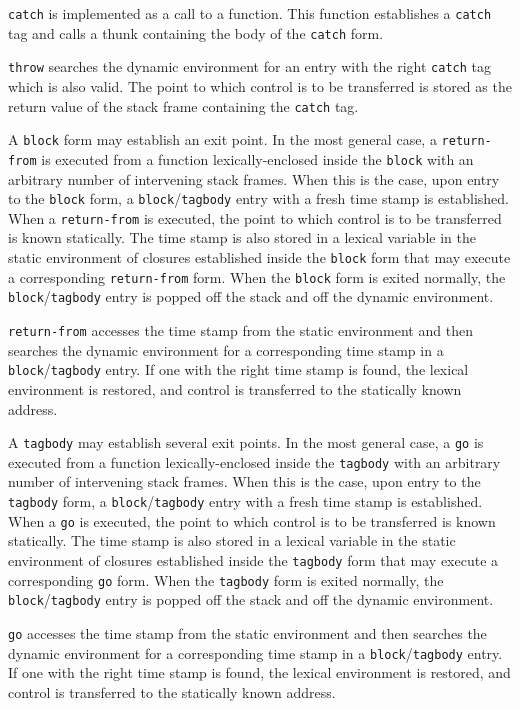 \texttt{catch} is implemented as a call to a function.  This function
establishes a \texttt{catch} tag and calls a thunk containing the body
of the \texttt{catch} form.

\texttt{throw} searches the dynamic environment for an entry with the
right \texttt{catch} tag which is also valid.  The point to which
control is to be transferred is stored as the return value of the
stack frame containing the \texttt{catch} tag.

A \texttt{block} form may establish an exit point.  In the most
general case, a \texttt{return-from} is executed from a function
lexically-enclosed inside the \texttt{block} with an arbitrary number
of intervening stack frames.  When this is the case, upon entry to the
\texttt{block} form, a \texttt{block}/\texttt{tagbody} entry with a
fresh time stamp is established.  When a \texttt{return-from} is
executed, the point to which control is to be transferred is known
statically.  The time stamp is also stored in a lexical variable in
the static environment of closures established inside the
\texttt{block} form that may execute a corresponding
\texttt{return-from} form.  When the \texttt{block} form is exited normally, the
\texttt{block}/\texttt{tagbody} entry is popped off the stack and off
the dynamic environment.

\texttt{return-from} accesses the time stamp from the static
environment and then searches the dynamic environment for a
corresponding time stamp in a \texttt{block}/\texttt{tagbody} entry.
If one with the right time stamp is found, the lexical environment is
restored, and control is transferred to the statically known address.

A \texttt{tagbody} may establish several exit points.  In the most
general case, a \texttt{go} is executed from a function
lexically-enclosed inside the \texttt{tagbody} with an arbitrary
number of intervening stack frames.  When this is the case, upon entry
to the \texttt{tagbody} form, a \texttt{block}/\texttt{tagbody} entry
with a fresh time stamp is established.  When a \texttt{go} is
executed, the point to which control is to be transferred is known
statically.  The time stamp is also stored in a lexical variable in
the static environment of closures established inside the
\texttt{tagbody} form that may execute a corresponding \texttt{go}
form.  When the \texttt{tagbody} form is exited normally, the
\texttt{block}/\texttt{tagbody} entry is popped off the stack and off
the dynamic environment.

\texttt{go} accesses the time stamp from the static environment and
then searches the dynamic environment for a corresponding time stamp
in a \texttt{block}/\texttt{tagbody} entry.  If one with the right
time stamp is found, the lexical environment is restored, and control
is transferred to the statically known address.

